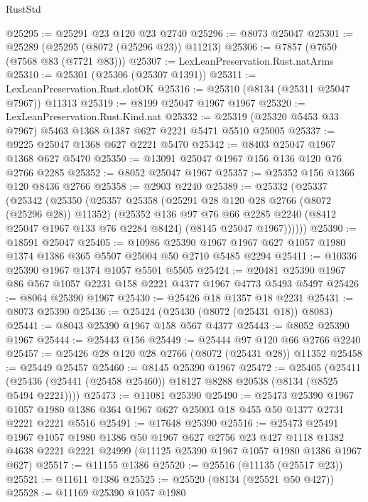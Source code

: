 \begin{lexlean}{RustStd}
\begin{coremodule}
@25295 := @25291 @23 @120 @23 @2740
@25296 := @8073 @25047
@25301 := @25289 (@25295 (@8072 (@25296 @23)) @11213)
@25306 := @7857 (@7650 (@7568 @83 (@7721 @83)))
@25307 := LexLeanPreservation.Rust.natArms
@25310 := @25301 (@25306 (@25307 @1391))
@25311 := LexLeanPreservation.Rust.slotOK
@25316 := @25310 (@8134 (@25311 @25047 @7967)) @11313
@25319 := @8199 @25047 @1967 @1967
@25320 := LexLeanPreservation.Rust.Kind.nat
@25332 := @25319 (@25320 @5453 @33 @7967) @5463 @1368 @1387 @627 @2221 @5471 @5510 @25005
@25337 := @9225 @25047 @1368 @627 @2221 @5470
@25342 := @8403 @25047 @1967 @1368 @627 @5470
@25350 := @13091 @25047 @1967 @156 @136 @120 @76 @2766 @2285
@25352 := @8052 @25047 @1967
@25357 := @25352 @156 @1366 @120 @8436 @2766
@25358 := @2903 @2240
@25389 := @25332
    (@25337
      (@25342
        (@25350
          (@25357
            @25358
            (@25291 @28 @120 @28 @2766 (@8072 (@25296 @28)) @11352)
            (@25352
              @136
              @97
              @76
              @66
              @2285
              @2240
              (@8412 @25047 @1967 @133 @76 @2284 @8424)
              (@8145 @25047 @1967))))))
@25390 := @18591 @25047
@25405 := @10986
    @25390
    @1967
    @1967
    @627
    @1057
    @1980
    @1374
    @1386
    @365
    @5507
    @25004
    @50
    @2710
    @5485
    @2294
@25411 := @10336 @25390 @1967 @1374 @1057 @5501 @5505
@25424 := @20481 @25390 @1967 @86 @567 @1057 @2231 @158 @2221 @4377 @1967 @4773 @5493 @5497
@25426 := @8064 @25390 @1967
@25430 := @25426 @18 @1357 @18 @2231
@25431 := @8073 @25390
@25436 := @25424 (@25430 (@8072 (@25431 @18)) @8083)
@25441 := @8043 @25390 @1967 @158 @567 @4377
@25443 := @8052 @25390 @1967
@25444 := @25443 @156
@25449 := @25444 @97 @120 @66 @2766 @2240
@25457 := @25426 @28 @120 @28 @2766 (@8072 (@25431 @28)) @11352
@25458 := @25449 @25457
@25460 := @8145 @25390 @1967
@25472 := @25405
    (@25411 (@25436 (@25441 (@25458 @25460)) @18127 @8288 @20538 (@8134 (@8525 @5494 @2221))))
@25473 := @11081 @25390
@25490 := @25473
    @25390
    @1967
    @1057
    @1980
    @1386
    @364
    @1967
    @627
    @25003
    @18
    @455
    @50
    @1377
    @2731
    @2221
    @2221
    @5516
@25491 := @17648 @25390
@25516 := @25473
    @25491
    @1967
    @1057
    @1980
    @1386
    @50
    @1967
    @627
    @2756
    @23
    @427
    @1118
    @1382
    @4638
    @2221
    @2221
    @24999
    (@11125 @25390 @1967 @1057 @1980 @1386 @1967 @627)
@25517 := @11155 @1386
@25520 := @25516 (@11135 (@25517 @23))
@25521 := @11611 @1386
@25525 := @25520 (@8134 (@25521 @50 @427))
@25528 := @11169 @25390 @1057 @1980

\end{coremodule}
\end{lexlean}
